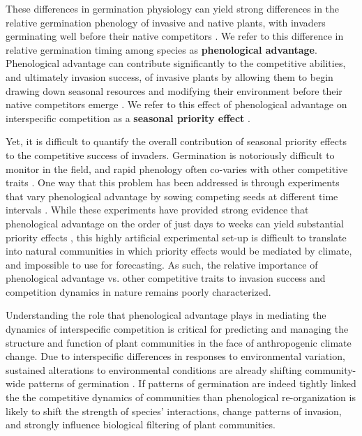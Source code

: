 \documentclass{article}[11pt]
\begin{document}
These differences in germination physiology can yield strong differences in the relative germination phenology of invasive and native plants, with invaders germinating well before their native competitors \citep{Gioria:2017wo}. We refer to this difference in relative germination timing among species as \textbf{phenological advantage}. Phenological advantage can contribute significantly to the competitive abilities, and ultimately invasion success, of invasive plants by allowing them to begin drawing down seasonal resources and modifying their environment before their native competitors emerge \citep{Kardol2013}. We refer to this effect of phenological advantage on interspecific competition as a \textbf{seasonal priority effect} \citep{Wainwright_2011}.

Yet, it is difficult to quantify the overall contribution of seasonal priority effects to the competitive success of invaders. Germination is notoriously difficult to monitor in the field, and rapid phenology often co-varies with other competitive traits \citep{Dickson2012,Milbau:2003vt,HAO:2009vh}. %
One way that this problem has been addressed is through experiments that vary phenological advantage by sowing competing seeds at different time intervals \citep{Young:2017aa}. While these experiments have provided strong evidence that phenological advantage on the order of just days to weeks can yield substantial priority effects \citep{Weidlich:2020aa}, this highly artificial experimental set-up is difficult to translate into natural communities in which priority effects would be mediated by climate, and impossible to use for forecasting. As such, the relative importance of phenological advantage vs. other competitive traits to invasion success and competition dynamics in nature remains poorly characterized. 

Understanding the role that phenological advantage plays in mediating the dynamics of interspecific competition is critical for predicting and managing the structure and function of plant communities in the face of anthropogenic climate change. Due  to interspecific differences in responses to environmental variation, sustained alterations to environmental conditions are already shifting community-wide patterns of germination \citep{Walck2011}. If patterns of germination are indeed tightly linked the the competitive dynamics of communities than phenological re-organization is likely to shift the strength of species' interactions, change patterns of invasion, and strongly influence biological filtering of plant communities. 
\end{document}
